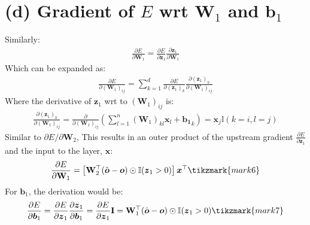 \documentclass[11pt, a4paper, oneside]{memoir}
\begin{document}
\section*{(d) Gradient of $E$ wrt $\boldsymbol{W}_1$ and $\boldsymbol{b}_1$}
Similarly:
\begin{align*}
    \frac{\partial E}{\partial \mathbf{W}_1} = \frac{\partial E}{\partial \boldsymbol{z}_1} \frac{\partial \boldsymbol{z}_1}{\partial \mathbf{W}_1}
\end{align*}
Which can be expanded as:
\begin{align*}
    \frac{\partial E}{\partial (\boldsymbol{W}_1)_{ij}} = \sum_{k=1}^{d} \frac{\partial E}{\partial (\boldsymbol{z}_1)_k} \frac{\partial (\boldsymbol{z}_1)_k}{\partial (\boldsymbol{W}_1)_{ij}}
\end{align*}
Where the derivative of $\boldsymbol{z}_1$ wrt to $(\boldsymbol{W}_1)_{ij}$ is:
\begin{align*}
    \frac{\partial (\boldsymbol{z}_1)_k}{\partial (\boldsymbol{W}_1)_{ij}} = \frac{\partial}{\partial (\boldsymbol{W}_1)_{ij}} \left( \sum_{l=1}^{n} (\mathbf{W}_1)_{kl} \boldsymbol{x}_l + \boldsymbol{b_1}_k \right) = \boldsymbol{x}_j \mathbb{I}(k=i,l=j)
\end{align*}
Similar to $\partial E / \partial \mathbf{W}_2$, This results in an outer product of the upstream gradient $\frac{\partial E}{\partial \boldsymbol{z}_1}$ and the input to the layer, $\boldsymbol{x}$:
\begin{align*}
    \frac{\partial E}{\partial \mathbf{W}_1} = \left[ \mathbf{W}_2^\top (\hat{\boldsymbol{o}} - \boldsymbol{o}) \odot \mathbb{I}(\boldsymbol{z}_1 > 0) \right] \boldsymbol{x}^\top
    \tikzmark{mark6}
\end{align*}
For $\boldsymbol{b}_1$, the derivation would be:
\begin{align*}
    \frac{\partial E}{\partial \boldsymbol{b}_1} = \frac{\partial E}{\partial \boldsymbol{z}_1} \frac{\partial \boldsymbol{z}_1}{\partial \boldsymbol{b}_1} = 
    \frac{\partial E}{\partial \boldsymbol{z}_1} \mathbf{I} = \mathbf{W}_1^\top (\hat{\boldsymbol{o}} - \boldsymbol{o}) \odot \mathbb{I}(\boldsymbol{z}_1 > 0)
    \tikzmark{mark7}
\end{align*}
\end{document}
